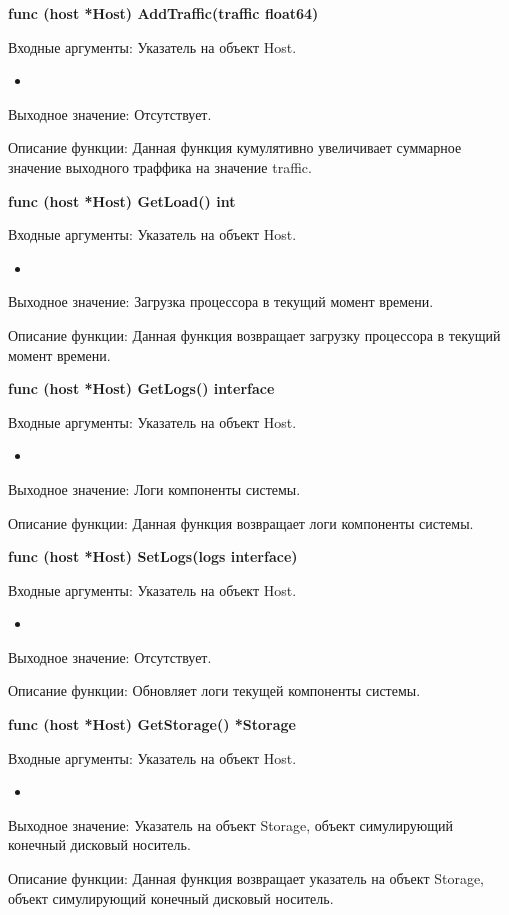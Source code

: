 \textbf{func (host *Host) AddTraffic(traffic float64)}

Входные аргументы: Указатель на объект Host.
\begin{itemize}
	\item 
\end{itemize}
Выходное значение: Отсутствует.

Описание функции: Данная функция кумулятивно увеличивает суммарное значение выходного траффика на значение traffic. 


\textbf{func (host *Host) GetLoad() int }

Входные аргументы: Указатель на объект Host.
\begin{itemize}
	\item 
\end{itemize}
Выходное значение: Загрузка процессора в текущий момент времени.

Описание функции: Данная функция возвращает загрузку процессора в текущий момент времени.


\textbf{func (host *Host) GetLogs() interface}

Входные аргументы: Указатель на объект Host.
\begin{itemize}
	\item 
\end{itemize}
Выходное значение: Логи компоненты системы. 

Описание функции: Данная функция возвращает логи компоненты системы. 


\textbf{func (host *Host) SetLogs(logs interface)}

Входные аргументы: Указатель на объект Host.
\begin{itemize}
	\item 
\end{itemize}
Выходное значение: Отсутствует.

Описание функции: Обновляет логи текущей компоненты системы. 


\textbf{func (host *Host) GetStorage() *Storage }

Входные аргументы: Указатель на объект Host.
\begin{itemize}
	\item 
\end{itemize}
Выходное значение: Указатель на объект Storage, объект симулирующий конечный дисковый носитель.

Описание функции: Данная функция возвращает указатель на объект Storage, объект симулирующий конечный дисковый носитель.


